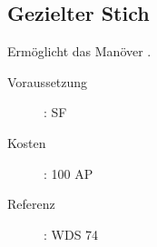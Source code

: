 \subsection{Gezielter Stich}
\label{sf.gezielter_stich}
Ermöglicht das Manöver .
\begin{description}
    \item[Voraussetzung]:
        SF 
    \item [Kosten]:
        100 AP
    \item [Referenz]:
        WDS 74
\end{description}
